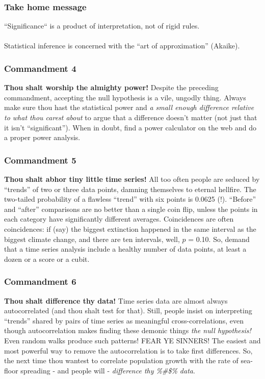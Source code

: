 \documentclass{beamer}
\begin{document}
  
  
  \begin{frame}
    \frametitle{Take home message}
    \huge{``Significance`` is a product of interpretation, not of rigid rules.}
    \\~\\
    \huge{Statistical inference is concerned with the ``art of approximation''} \small{(Akaike)}.
  \end{frame}



  \begin{frame}
    \frametitle{Commandment 4}
    \textbf{Thou shalt worship the almighty power! }
    Despite the preceding commandment, accepting the null hypothesis is a vile, ungodly thing. 
    Always make sure thou hast the statistical power and \emph{a small enough difference relative to what thou carest about} to argue that a difference doesn't matter (not just that it isn't ``significant''). 
    When in doubt, find a power calculator on the web and do a proper power analysis.
  \end{frame}
  
  
  
  \begin{frame}
    \frametitle{Commandment 5}
    \textbf{Thou shalt abhor tiny little time series! }
    All too often people are seduced by ``trends'' of two or three data points, damning themselves to eternal hellfire. 
    The two-tailed probability of a flawless ``trend'' with six points is 0.0625 (!). 
    ``Before'' and ``after'' comparisons are no better than a single coin flip, unless the points in each category have significantly different averages. 
    Coincidences are often coincidences: if (say) the biggest extinction happened in the same interval as the biggest climate change, and there are ten intervals, well, \(p\) = 0.10. 
    So, demand that a time series analysis include a healthy number of data points, at least a dozen or a score or a cubit.
  \end{frame}



  \begin{frame}
    \frametitle{Commandment 6}
    \textbf{Thou shalt difference thy data! }
    Time series data are almost always autocorrelated (and thou shalt test for that). 
    Still, people insist on interpreting ``trends'' shared by pairs of time series as meaningful cross-correlations, even though autocorrelation makes finding these demonic things \emph{the null hypothesis!} 
    Even random walks produce such patterns! FEAR YE SINNERS! 
    The easiest and most powerful way to remove the autocorrelation is to take first differences. 
    So, the next time thou wantest to correlate population growth with the rate of sea-floor spreading - and people will - \emph{difference thy \%\!\@\#\$\% data}.
  \end{frame}
\end{document}
